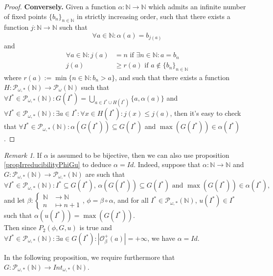 \documentclass[a4paper,11pt]{article}
\theoremstyle{plain}
\theoremstyle{definition}
\theoremstyle{remark}
\newtheorem{remark}{Remark}[section]
\begin{document}
\begin{proof}
\textbf{Conversely.} Given a function $\alpha : \mathbb{N} \to \mathbb{N}$ which admits an infinite number of fixed points $\{b_n\}_{n \in \mathbb{N}}$ in strictly increasing order, such that there exists a function $j : \mathbb{N} \to \mathbb{N}$ such that 
\[ \forall a \in \mathbb{N} : \alpha(a) = b_{j(a)} \]
and
\begin{align*}
\forall a \in \mathbb{N} : j(a) &= n \text{ if } \exists n \in \mathbb{N} : a = b_n \\
j(a) &\geq r(a) \text{ if } a \notin \{b_n\}_{n \in \mathbb{N}}
\end{align*}
where $r(a) := \min\{n \in \mathbb{N} : b_n > a \}$, and such that there exists a function $H : \mathcal{P}_{\omega,*}(\mathbb{N}) \to  \mathcal{P}_{\omega}(\mathbb{N})$ such that $\forall I^* \in  \mathcal{P}_{\omega,*}(\mathbb{N}) : G(I^*) = \bigcup_{a \in I^* \cup H(I^*)} \{a,\alpha(a)\}$ and $\forall I^* \in  \mathcal{P}_{\omega,*}(\mathbb{N}) : \exists a \in I^* : \forall x \in H(I^*) : j(x) \leq j(a)$, then it's easy to check that $\forall I^* \in  \mathcal{P}_{\omega,*}(\mathbb{N}) : \alpha(G(I^*)) \subseteq G(I^*)$ and $\max(G(I^*)) \in \alpha(I^*)$.
\end{proof}

\begin{remark}
If $\alpha$ is assumed to be bijective, then we can also use proposition \ref{propIrreducibilityPhiGu} to deduce $\alpha = Id$. Indeed, suppose that $\alpha : \mathbb{N} \to \mathbb{N}$ and $G : \mathcal{P}_{\omega,*}(\mathbb{N}) \to \mathcal{P}_{\omega,*}(\mathbb{N})$ are such that
\[ \forall I^* \in \mathcal{P}_{\omega,*}(\mathbb{N}) : I^* \subseteq G(I^*) \text{, } \alpha(G(I^*)) \subseteq G(I^*) \text{ and } \max(G(I^*)) \in \alpha(I^*), \] 
and let $\beta : \begin{cases}  \mathbb{N} &\to \mathbb{N} \\ n &\mapsto n+1 \end{cases}$, $\phi = \beta \circ \alpha$, and for all $I^* \in \mathcal{P}_{\omega,*}(\mathbb{N})$, $u(I^*) \in I^*$ such that $\alpha(u(I^*)) = \max(G(I^*))$. \\
Then since $P_2(\phi,G,u)$ is true and $\forall I^* \in \mathcal{P}_{\omega,*}(\mathbb{N}) : \exists a \in G(I^*) : |\mathcal{O}^{+}_\beta(a)| = +\infty$, we have $\alpha = Id$.
\end{remark}

In the following proposition, we require furthermore that $G : \mathcal{P}_{\omega,*}(\mathbb{N}) \to Int_{\omega,*}(\mathbb{N})$.
\end{document}
